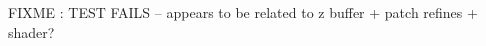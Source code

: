 \documentclass[a4paper]{article}
\begin{document}
\pgfplotsset{
	shader=faceted interp,
	patch refines=1,
}
FIXME : TEST FAILS -- appears to be related to z buffer + patch refines + shader?
\FIXIT

\end{document}

